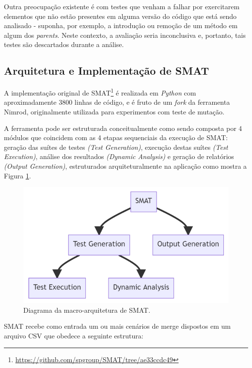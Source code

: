 \documentclass[12pt]{article}
\begin{document}
Outra preocupação existente é com testes que venham a falhar por exercitarem elementos que não estão presentes em alguma versão do código que está sendo analisado - suponha, por exemplo, a introdução ou remoção de um método em algum dos \textit{parents}. Neste contexto, a avaliação seria inconclusiva e, portanto, tais testes são descartados durante a análise.

\subsection{Arquitetura e Implementação de SMAT}
A implementação original de SMAT\footnote{\href{https://github.com/spgroup/SMAT/tree/ae33ccdc49}{https://github.com/spgroup/SMAT/tree/ae33ccdc49}} é realizada em \textit{Python} com aproximadamente 3800 linhas de código, e é fruto de um \textit{fork} da ferramenta Nimrod, originalmente utilizada para experimentos com teste de mutação.

A ferramenta pode ser estruturada conceitualmente como sendo composta por 4 módulos que coincidem com as 4 etapas sequenciais da execução de SMAT: geração das suítes de testes \textit{(Test Generation)}, execução destas suítes \textit{(Test Execution)}, análise dos resultados \textit{(Dynamic Analysis)} e geração de relatórios \textit{(Output Generation)}, estruturados arquiteturalmente na aplicação como mostra a Figura \ref{fig:macro-velha}.

\begin{figure}[H]
    \centering
    \includegraphics[width=.5\textwidth]{arquitetura-velha.png}
    \caption{Diagrama da macro-arquitetura de SMAT.}
    \label{fig:macro-velha}
\end{figure}

SMAT recebe como entrada um ou mais cenários de merge dispostos em um arquivo CSV que obedece a seguinte estrutura:
\end{document}
